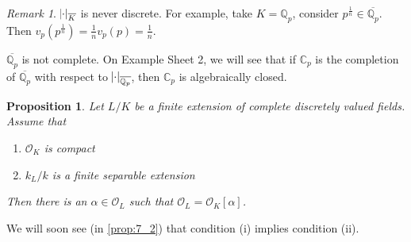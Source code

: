\documentclass[11pt]{article}
\theoremstyle{definition}
\theoremstyle{plain}
\newtheorem{proposition}[definition]{Proposition}
\theoremstyle{remark}
\newtheorem*{remark}{Remark}
\newcommand{\bQ}{\mathbb{Q}}
\newcommand{\bC}{\mathbb{C}}
\newcommand{\cO}{\mathcal{O}}
\begin{document}
\begin{remark}
    $\abs{\cdot}_{\overline{K}}$ is never discrete. For example, take $K = \bQ_p$, consider $p^\frac{1}{n} \in \overline{\bQ_p}$. Then $v_p(p^\frac{1}{n}) = \frac{1}{n} v_p(p) = \frac{1}{n}$.

    $\overline{\bQ_p}$ is not complete. On Example Sheet 2, we will see that if $\bC_p$ is the completion of $\overline{\bQ_p}$ with respect to $\abs{\cdot}_{\overline{\bQ_p}}$, then $\bC_p$ is algebraically closed.
\end{remark}

\begin{proposition}\label{prop:6_12}
    Let $L/K$ be a finite extension of complete discretely valued fields. Assume that
    \begin{enumerate}
        \item $\cO_K$ is compact
        \item $k_L / k$ is a finite separable extension
    \end{enumerate}
Then there is an $\alpha \in \cO_L$ such that $\cO_L = \cO_K[\alpha]$.
\end{proposition}

\noindent We will soon see (in \autoref{prop:7_2}) that condition (i) implies condition (ii).
\end{document}
